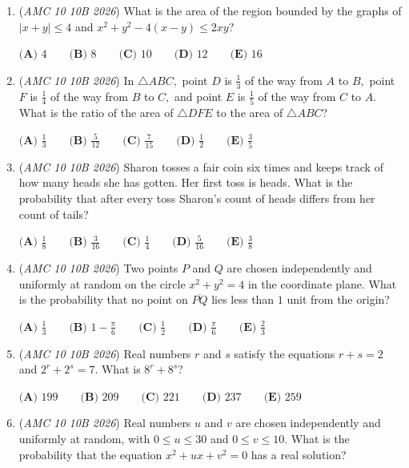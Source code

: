 \begin{enumerate}
	\item (\textit{AMC 10 10B 2026}) What is the area of the region bounded by the graphs of $|x+y| \leq 4$ and $x^2+y^2-4(x-y) \leq 2xy$?


 $\textbf{(A) } 4 \qquad \textbf{(B) } 8 \qquad \textbf{(C) } 10 \qquad \textbf{(D) } 12 \qquad \textbf{(E) } 16$


	\item (\textit{AMC 10 10B 2026}) In $\triangle ABC,$ point $D$ is $\frac{1}{3}$ of the way from $A$ to $B,$ point $F$ is $\frac{1}{4}$ of the way from $B$ to $C,$ and point $E$ is $\frac{1}{5}$ of the way from $C$ to $A.$ What is the ratio of the area of $\triangle DFE$ to the area of $\triangle ABC$?


 $\textbf{(A) } \frac{1}{3} \qquad \textbf{(B) } \frac{5}{12} \qquad \textbf{(C) } \frac{7}{15} \qquad \textbf{(D) } \frac{1}{2} \qquad \textbf{(E) } \frac{3}{5}$


	\item (\textit{AMC 10 10B 2026}) Sharon tosses a fair coin six times and keeps track of how many heads she has gotten. Her first toss is heads. What is the probability that after every toss Sharon's count of heads differs from her count of tails?


 $\textbf{(A) } \frac{1}{8} \qquad \textbf{(B) } \frac{3}{16} \qquad \textbf{(C) } \frac{1}{4} \qquad \textbf{(D) } \frac{5}{16} \qquad \textbf{(E) } \frac{3}{8}$


	\item (\textit{AMC 10 10B 2026}) Two points $P$ and $Q$ are chosen independently and uniformly at random on the circle $x^2+y^2=4$ in the coordinate plane. What is the probability that no point on $\overline{PQ}$ lies less than $1$ unit from the origin?


 $\textbf{(A) } \frac{1}{3} \qquad \textbf{(B) } 1-\frac{\pi}{6} \qquad \textbf{(C) } \frac{1}{2} \qquad \textbf{(D) } \frac{\pi}{6} \qquad \textbf{(E) } \frac{2}{3}$


	\item (\textit{AMC 10 10B 2026}) Real numbers $r$ and $s$ satisfy the equations $r+s=2$ and $2^r+2^s=7.$ What is $8^r+8^s$?


 $\textbf{(A) } 199 \qquad \textbf{(B) } 209 \qquad \textbf{(C) } 221 \qquad \textbf{(D) } 237 \qquad \textbf{(E) } 259$


	\item (\textit{AMC 10 10B 2026}) Real numbers $u$ and $v$ are chosen independently and uniformly at random, with $0\leq u\leq 30$ and $0\leq v\leq 10.$ What is the probability that the equation $x^2+ux+v^2=0$ has a real solution?



\end{enumerate}
